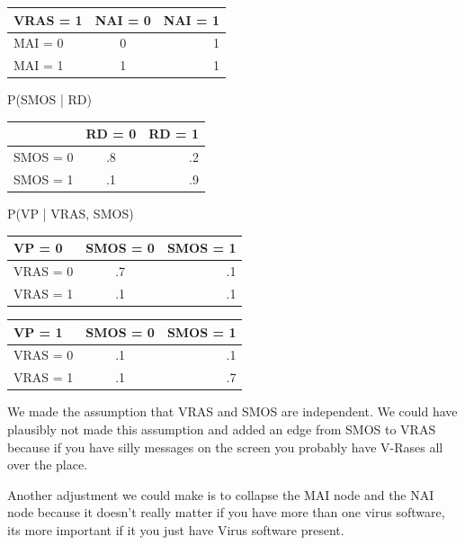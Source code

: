 \documentclass[solution, letterpaper]{cs121}
\begin{document}
\begin{empfile}
\begin{center}
\begin{tabular}{ l |c r }
   VRAS = 1 & NAI = 0 & NAI = 1 \\
   \hline
  MAI = 0 & 0 & 1 \\
  MAI = 1 & 1 & 1 \\
\end{tabular}
\end{center}


P(SMOS | RD)\\
\begin{center}
\begin{tabular}{ l |c r }
   & RD = 0 & RD = 1 \\
   \hline
  SMOS = 0 & .8 & .2 \\
  SMOS = 1 & .1 & .9 \\
\end{tabular}
\end{center}


P(VP | VRAS, SMOS)\\
\begin{center}
\begin{tabular}{ l |c r }
   VP = 0 & SMOS = 0 & SMOS = 1 \\
   \hline
  VRAS = 0 & .7 & .1 \\
  VRAS = 1 & .1 & .1 \\
\end{tabular}
\end{center}

\begin{center}
\begin{tabular}{ l |c r }
   VP = 1 & SMOS = 0 & SMOS = 1 \\
   \hline
  VRAS = 0 & .1 & .1 \\
  VRAS = 1 & .1 & .7 \\
\end{tabular}
\end{center}

\subproblem %
 We made the assumption that VRAS and SMOS are independent. We could have plausibly not made this assumption and added an edge from SMOS to VRAS because if you have silly messages on the screen you probably have V-Rases all over the place.  
 
 Another adjustment we could make is to collapse the MAI node and the NAI node because it doesn't really matter if you have more than one virus software, its more important if it you just have Virus software present. 


\end{empfile}
\end{document}
